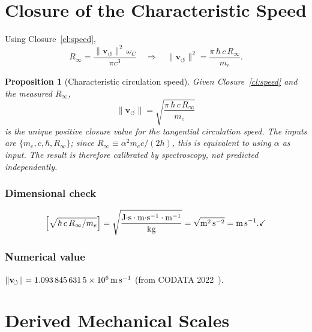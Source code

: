 \documentclass[aps,pra,preprint,longbibliography,nofootinbib]{revtex4-2}
\newtheorem{proposition}{Proposition}
\newcommand{\vnorm}{\lVert\mathbf{v}_{\!\boldsymbol{\circlearrowleft}}\rVert} %
\newcommand{\omC}{\omega_C}                      %
\newcommand{\Rinf}{R_\infty}                     %
\begin{document}
\section{Closure of the Characteristic Speed}
\label{sec:derivation}

Using Closure~\ref{cl:speed},
\begin{equation}
  \Rinf = \frac{\vnorm^2\,\omC}{\pi c^3}
  \quad\Longrightarrow\quad
  \vnorm^2 = \frac{\pi\,\hbar\,c\,\Rinf}{m_e}.
  \label{eq:vc_solve}
\end{equation}

\begin{proposition}[Characteristic circulation speed]
\label{prop:vc}
Given Closure~\ref{cl:speed} and the measured $\Rinf$,
\begin{equation}
  \boxed{
    \vnorm = \sqrt{\frac{\pi\,\hbar\,c\,\Rinf}{m_e}}
  }
  \label{eq:vc}
\end{equation}
is the unique positive closure value for the tangential
circulation speed.
The inputs are $\{m_e, c, \hbar, \Rinf\}$; since
$\Rinf \equiv \alpha^2 m_e c/(2h)$, this is equivalent to using
$\alpha$ as input.  The result is therefore calibrated by spectroscopy,
not predicted independently.
\end{proposition}

\subsubsection*{Dimensional check}
\[
  \Bigl[\sqrt{\hbar\,c\,\Rinf/m_e}\Bigr]
  = \sqrt{
      \frac{\mathrm{J{\cdot}s\cdot m{\cdot}s^{-1}\cdot m^{-1}}}
           {\mathrm{kg}}
    }
  = \sqrt{\mathrm{m^2\,s^{-2}}} = \mathrm{m\,s^{-1}}. \checkmark
\]

\subsubsection*{Numerical value}
$\vnorm = \SI{1.093\,845\,631\,5e6}{\meter\per\second}$
\quad(from CODATA 2022~\cite{MohrTaylor2022}).

\section{Derived Mechanical Scales}
\label{sec:derived}
\end{document}
